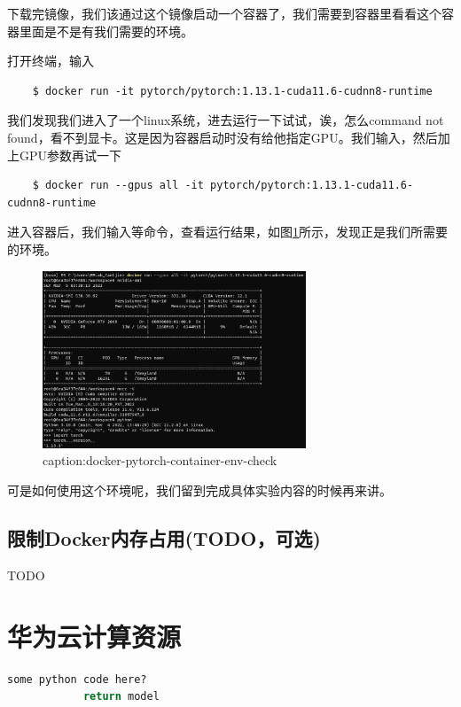 下载完镜像，我们该通过这个镜像启动一个容器了，我们需要到容器里看看这个容器里面是不是有我们需要的环境。

打开终端，输入
\begin{lstlisting}
    $ docker run -it pytorch/pytorch:1.13.1-cuda11.6-cudnn8-runtime
\end{lstlisting}
我们发现我们进入了一个linux系统，进去运行一下试试，诶，怎么command not found，看不到显卡。这是因为容器启动时没有给他指定GPU。我们输入，然后加上GPU参数再试一下
\begin{lstlisting}
    $ docker run --gpus all -it pytorch/pytorch:1.13.1-cuda11.6-cudnn8-runtime 
\end{lstlisting}

进入容器后，我们输入等命令，查看运行结果，如图\ref{fig:docker-pytorch-container-env-check}所示，发现正是我们所需要的环境。
\begin{figure}[htbp]
	\centering
	\includegraphics[width=0.7\textwidth]{figures/docker-pytorch-container-env-check.png}
	\caption{caption:docker-pytorch-container-env-check}
	\label{fig:docker-pytorch-container-env-check}
\end{figure}

可是如何使用这个环境呢，我们留到完成具体实验内容的时候再来讲。


\subsection{限制Docker内存占用(TODO，可选)}

TODO


\section{华为云计算资源}




\begin{lstlisting}[language=Python, caption=Python example]
    some python code here?
            return model
\end{lstlisting}